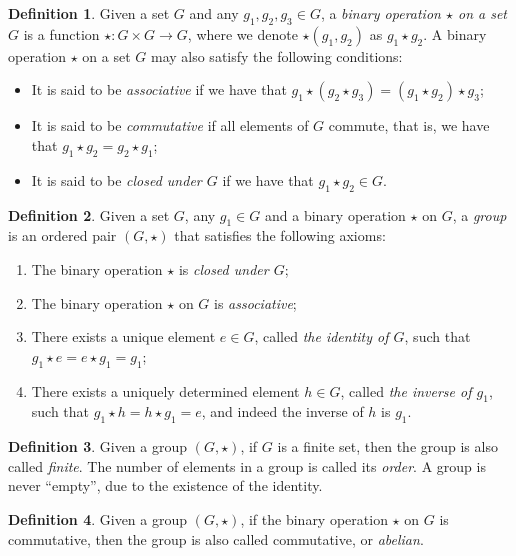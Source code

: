 \documentclass[draft, 12pt, a4paper, oneside]{memoir}
\theoremstyle{definition}
\newtheorem{definition}{Definition}[section]
\theoremstyle{remark}
\begin{document}
\begin{definition}
  Given a set $G$ and any $g_{1}, g_{2}, g_{3} \in G$, a \emph{binary operation $\star$ on a set $G$} is a function $\star : G \times G \to G$, where we denote $\star(g_{1}, g_{2})$ as $g_{1} \star g_{2}$. A binary operation $\star$ on a set $G$ may also satisfy the following conditions:
  
  \begin{itemize}
    \item It is said to be \emph{associative} if we have that $g_{1} \star (g_{2} \star g_{3}) = (g_{1} \star g_{2}) \star g_{3}$;
    \item It is said to be \emph{commutative} if all elements of $G$ commute, that is, we have that $g_{1} \star g_{2} = g_{2} \star g_{1}$;
    \item It is said to be \emph{closed under $G$} if we have that $g_{1} \star g_{2} \in G$.
  \end{itemize}
\end{definition}

\begin{definition}
  Given a set $G$, any $g_{1} \in G$ and a binary operation $\star$ on $G$, a \emph{group} is an ordered pair $(G, \star)$ that satisfies the following axioms:
  
  \begin{enumerate}
    \item The binary operation $\star$ is \emph{closed under $G$};
    \item The binary operation $\star$ on $G$ is \emph{associative};
    \item There exists a unique element $e \in G$, called \emph{the identity of $G$}, such that $g_{1} \star e = e \star g_{1} = g_{1}$;
    \item There exists a uniquely determined element $h \in G$, called \emph{the inverse of $g_{1}$}, such that $g_{1} \star h = h \star g_{1} = e$, and indeed the inverse of $h$ is $g_{1}$.
  \end{enumerate}
\end{definition}

\begin{definition}
  Given a group $(G, \star)$, if $G$ is a finite set, then the group is also called \emph{finite}. The number of elements in a group is called its \emph{order}. A group is never ``empty'', due to the existence of the identity.
\end{definition}

\begin{definition}
  Given a group $(G, \star)$, if the binary operation $\star$ on $G$ is commutative, then the group is also called commutative, or \emph{abelian}.
\end{definition}
\end{document}

